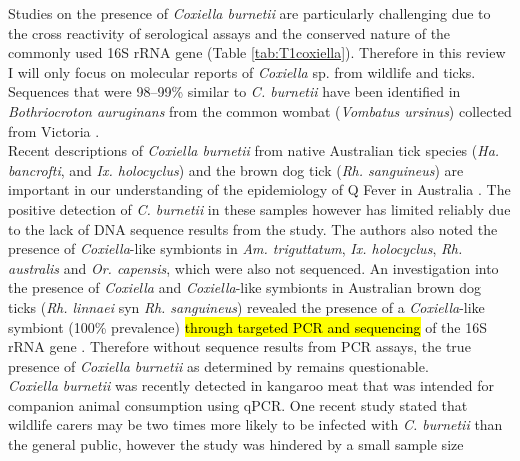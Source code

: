 \documentclass[a4paper, nobind]{templates/ociamthesis}
\begin{document}
Studies on the presence of \emph{Coxiella burnetii} are particularly challenging due to the cross reactivity of serological assays and the conserved nature of the commonly used 16S rRNA gene (Table \ref{tab:T1coxiella}).
Therefore in this review I will only focus on molecular reports of \emph{Coxiella} sp. from wildlife and ticks.
Sequences that were 98--99\% similar to \emph{C. burnetii} have been identified in
\emph{Bothriocroton auruginans} from the common wombat (\emph{Vombatus ursinus}) collected from Victoria \autocite{vilcinsMolecularDetectionRickettsia2009,beardMorphologicalIdentificationTicks2021}.\\
Recent descriptions of \emph{Coxiella burnetii} from native Australian tick species (\emph{Ha. bancrofti}, and \emph{Ix. holocyclus}) and the brown dog tick (\emph{Rh. sanguineus}) are important in our understanding of the epidemiology of Q Fever in Australia \autocite{chaladaMolecularSurveyTickBorne2018}.
The positive detection of \emph{C. burnetii} in these samples however has limited reliably due to the lack of DNA sequence results from the study.
The authors also noted the presence of \emph{Coxiella}-like symbionts in \emph{Am. triguttatum}, \emph{Ix. holocyclus}, \emph{Rh. australis} and \emph{Or. capensis}, which were also not sequenced.
An investigation into the presence of \emph{Coxiella} and \emph{Coxiella}-like symbionts in Australian brown dog ticks (\emph{Rh. linnaei} syn \emph{Rh. sanguineus}) revealed the presence of a \emph{Coxiella}-like symbiont (100\% prevalence) \hl{through targeted PCR and sequencing} of the 16S rRNA gene \autocite{oskamMolecularInvestigationPresence2017}.
Therefore without sequence results from PCR assays, the true presence of \emph{Coxiella burnetii} as determined by \textcite{chaladaMolecularSurveyTickBorne2018} remains questionable.\\
\emph{Coxiella burnetii} was recently detected in kangaroo meat that was intended for companion animal consumption \autocite{shapiroMolecularDetectionCoxiella2020} using qPCR.
One recent study stated that wildlife carers may be two times more likely to be infected with \emph{C. burnetii} than the general public, however the study was hindered by a small sample size \autocite{mathewsCoxiellaBurnetiiSeroprevalence2021}
\end{document}
